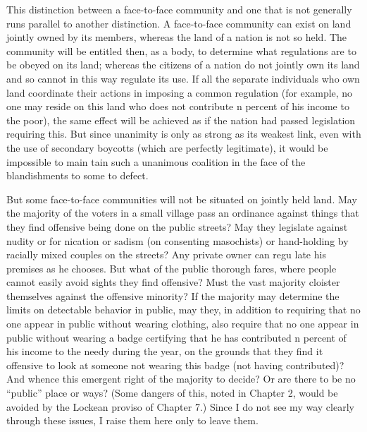 \documentclass[11pt,openany]{book}
\begin{document}
This distinction between a face-to-face community and one that is not generally runs parallel to another distinction. A face-to-face community can exist on land jointly owned by its members, whereas the land of a nation is not so held. The community will be entitled then, as a body, to determine what regulations are to be obeyed on its land; whereas the citizens of a nation do not jointly own its land and so cannot in this way regulate its use. If all the separate individuals who own land coordinate their actions in imposing a common regulation (for example, no one may reside on this land who does not contribute n percent of his income to the poor), the same effect will be achieved as if the nation had passed legislation requiring this. But since unanimity is only as strong as its weakest link, even with the use of secondary boycotts (which are perfectly legitimate), it would be impossible to main tain such a unanimous coalition in the face of the blandishments to some to defect. 

But some face-to-face communities will not be situated on jointly held land. May the majority of the voters in a small village pass an ordinance against things that they find offensive being done on the public streets? May they legislate against nudity or for nication or sadism (on consenting masochists) or hand-holding by racially mixed couples on the streets? Any private owner can regu late his premises as he chooses. But what of the public thorough fares, where people cannot easily avoid sights they find offensive? Must the vast majority cloister themselves against the offensive minority? If the majority may determine the limits on detectable behavior in public, may they, in addition to requiring that no one appear in public without wearing clothing, also require that no one appear in public without wearing a badge certifying that he has contributed n percent of his income to the needy during the year, on the grounds that they find it offensive to look at someone not wearing this badge (not having contributed)? And whence this emergent right of the majority to decide? Or are there to be no ``public'' place or ways? (Some dangers of this, noted in Chapter 2, would be avoided by the Lockean proviso of Chapter 7.) Since I do not see my way clearly through these issues, I raise them here only to leave them. 
\end{document}
